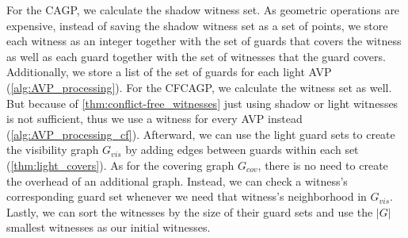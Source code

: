 For the CAGP, we calculate the shadow witness set. As geometric operations are expensive, instead of saving the shadow witness set as a set of points, we store each witness as an integer together with the set of guards that covers the witness as well as each guard together with the set of witnesses that the guard covers. Additionally, we store a list of the set of guards for each light AVP (\cref{alg:AVP_processing}). For the CFCAGP, we calculate the witness set as well. But because of \cref{thm:conflict-free_witnesses} just using shadow or light witnesses is not sufficient, thus we use a witness for every AVP instead (\cref{alg:AVP_processing_cf}). Afterward, we can use the light guard sets to create the visibility graph $G_{vis}$ by adding edges between guards within each set (\cref{thm:light_covers}). As for the covering graph $G_{cov}$, there is no need to create the overhead of an additional graph. Instead, we can check a witness's corresponding guard set whenever we need that witness's neighborhood in $G_{vis}$. Lastly, we can sort the witnesses by the size of their guard sets and use the $|G|$ smallest witnesses as our initial witnesses.


